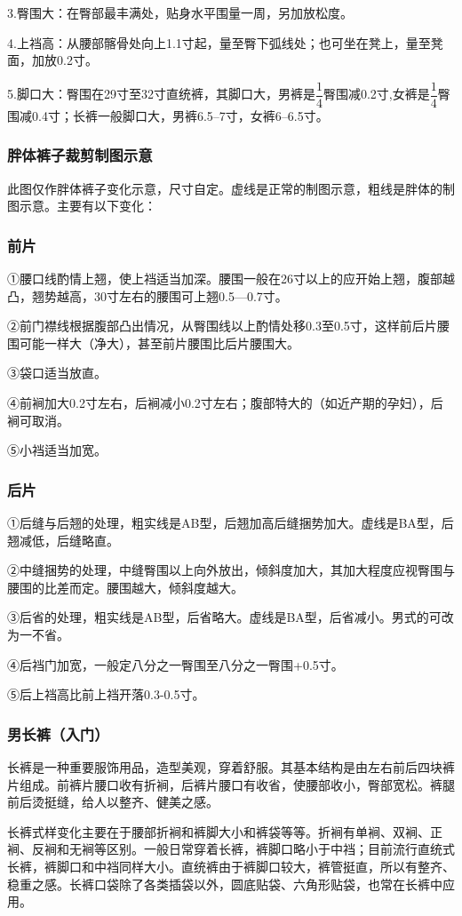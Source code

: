 \documentclass{ctexbook}
\begin{document}
3.臀围大：在臀部最丰满处，贴身水平围量一周，另加放松度。

4.上裆高：从腰部髂骨处向上1.1寸起，量至臀下弧线处；也可坐在凳上，量至凳面，加放0.2寸。

5.脚口大：臀围在29寸至32寸直统裤，其脚口大，男裤是$\dfrac{1}{4}$臀围减0.2寸,女裤是$\dfrac{1}{4}$臀围减0.4寸；长裤一般脚口大，男裤6.5--7寸，女裤6--6.5寸。
\subsubsection{胖体裤子裁剪制图示意}
此图仅作胖体裤子变化示意，尺寸自定。虚线是正常的制图示意，粗线是胖体的制图示意。主要有以下变化：
\subsubsection{前片}
①腰口线酌情上翘，使上裆适当加深。腰围一般在26寸以上的应开始上翘，腹部越凸，翘势越高，30寸左右的腰围可上翘0.5—0.7寸。

②前门襟线根据腹部凸出情况，从臀围线以上酌情处移0.3至0.5寸，这样前后片腰围可能一样大（净大），甚至前片腰围比后片腰围大。

③袋口适当放直。

④前裥加大0.2寸左右，后裥减小0.2寸左右；腹部特大的（如近产期的孕妇），后裥可取消。

⑤小裆适当加宽。
\subsubsection{后片}
①后缝与后翘的处理，粗实线是AB型，后翘加高后缝捆势加大。虚线是BA型，后翘减低，后缝略直。

②中缝捆势的处理，中缝臀围以上向外放出，倾斜度加大，其加大程度应视臀围与腰围的比差而定。腰围越大，倾斜度越大。

③后省的处理，粗实线是AB型，后省略大。虚线是BA型，后省减小。男式的可改为一不省。

④后裆门加宽，一般定八分之一臀围至八分之一臀围+0.5寸。

⑤后上裆高比前上裆开落0.3-0.5寸。

\subsubsection{男长裤（入门）}
长裤是一种重要服饰用品，造型美观，穿着舒服。其基本结构是由左右前后四块裤片组成。前裤片腰口收有折裥，后裤片腰口有收省，使腰部收小，臀部宽松。裤腿前后烫挺缝，给人以整齐、健美之感。

长裤式样变化主要在于腰部折裥和裤脚大小和裤袋等等。折裥有单裥、双裥、正裥、反裥和无裥等区别。一般日常穿着长裤，裤脚口略小于中裆；目前流行直统式长裤，裤脚口和中裆同样大小。直统裤由于裤脚口较大，裤管挺直，所以有整齐、稳重之感。长裤口袋除了各类插袋以外，圆底贴袋、六角形贴袋，也常在长裤中应用。
\end{document}

